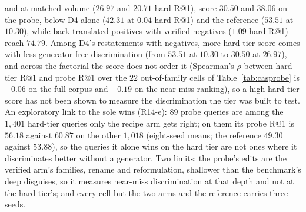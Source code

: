and at matched volume ($26.97$ and $20.71$ hard R@1), score $30.50$ and $38.06$ on the probe, below D4 alone ($42.31$ at $0.04$ hard R@1) and the reference ($53.51$ at $10.30$), while back-translated positives with verified negatives ($1.09$ hard R@1) reach $74.79$. Among D4's restatements with negatives, more hard-tier score comes with less generator-free discrimination (from $53.51$ at $10.30$ to $30.50$ at $26.97$), and across the factorial the score does not order it (Spearman's $\rho$ between hard-tier R@1 and probe R@1 over the $22$ out-of-family cells of Table~\ref{tab:casprobe} is $+0.06$ on the full corpus and $+0.19$ on the near-miss ranking), so a high hard-tier score has not been shown to measure the discrimination the tier was built to test. An exploratory link to the sole wins (R14-e): $89$ probe queries are among the $1{,}401$ hard-tier queries only the recipe arm gets right; on them its probe R@1 is $56.18$ against $60.87$ on the other $1{,}018$ (eight-seed means; the reference $49.30$ against $53.88$), so the queries it alone wins on the hard tier are not ones where it discriminates better without a generator. Two limits: the probe's edits are the verified arm's families, rename and reformulation, shallower than the benchmark's deep disguises, so it measures near-miss discrimination at that depth and not at the hard tier's; and every cell but the two arms and the reference carries three seeds.

